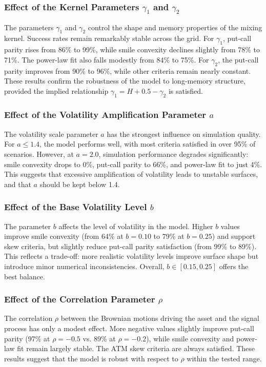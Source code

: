 \subsubsection*{Effect of the Kernel Parameters \texorpdfstring{$\gamma_1$}{gamma1} and \texorpdfstring{$\gamma_2$}{gamma2}}
The parameters $\gamma_1$ and $\gamma_2$ control the shape and memory properties of the mixing kernel. Success rates remain remarkably stable across the grid. For $\gamma_1$, put-call parity rises from 86\% to 99\%, while smile convexity declines slightly from 78\% to 71\%. The power-law fit also falls modestly from 84\% to 75\%. For $\gamma_2$, the put-call parity improves from 90\% to 96\%, while other criteria remain nearly constant. These results confirm the robustness of the model to long-memory structure, provided the implied relationship $\gamma_1 = H + 0.5 - \gamma_2$ is satisfied.

\subsubsection*{Effect of the Volatility Amplification Parameter \texorpdfstring{$a$}{a}}
The volatility scale parameter $a$ has the strongest influence on simulation quality. For $a \leq 1.4$, the model performs well, with most criteria satisfied in over 95\% of scenarios. However, at $a = 2.0$, simulation performance degrades significantly: smile convexity drops to 0\%, put-call parity to 66\%, and power-law fit to just 4\%. This suggests that excessive amplification of volatility leads to unstable surfaces, and that $a$ should be kept below 1.4.

\subsubsection*{Effect of the Base Volatility Level \texorpdfstring{$b$}{b}}
The parameter $b$ affects the level of volatility in the model. Higher $b$ values improve smile convexity (from 64\% at $b = 0.10$ to 79\% at $b = 0.25$) and support skew criteria, but slightly reduce put-call parity satisfaction (from 99\% to 89\%). This reflects a trade-off: more realistic volatility levels improve surface shape but introduce minor numerical inconsistencies. Overall, $b \in [0.15, 0.25]$ offers the best balance.

\subsubsection*{Effect of the Correlation Parameter \texorpdfstring{$\rho$}{rho}}
The correlation $\rho$ between the Brownian motions driving the asset and the signal process has only a modest effect. More negative values slightly improve put-call parity (97\% at $\rho = -0.5$ vs. 89\% at $\rho = -0.2$), while smile convexity and power-law fit remain largely stable. The ATM skew criteria are always satisfied. These results suggest that the model is robust with respect to $\rho$ within the tested range.

